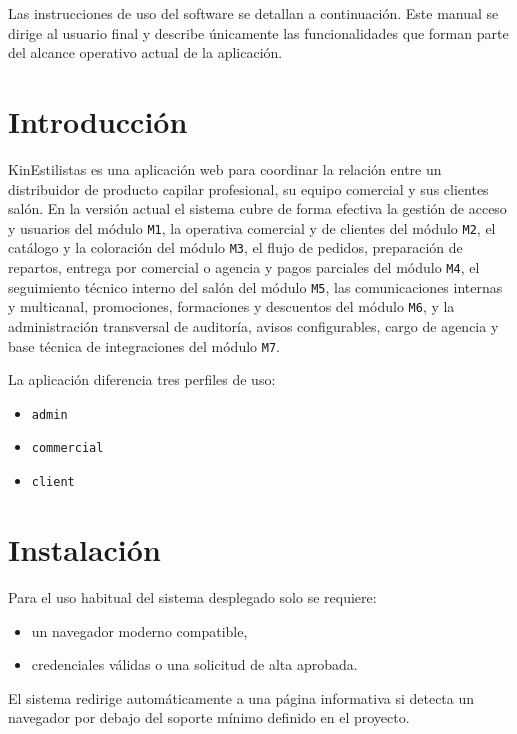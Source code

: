 Las instrucciones de uso del software se detallan a continuación. Este manual se dirige al usuario final y describe únicamente las funcionalidades que forman parte del alcance operativo actual de la aplicación.

\section{Introducción}

KinEstilistas es una aplicación web para coordinar la relación entre un distribuidor de producto capilar profesional, su equipo comercial y sus clientes salón. En la versión actual el sistema cubre de forma efectiva la gestión de acceso y usuarios del módulo \texttt{M1}, la operativa comercial y de clientes del módulo \texttt{M2}, el catálogo y la coloración del módulo \texttt{M3}, el flujo de pedidos, preparación de repartos, entrega por comercial o agencia y pagos parciales del módulo \texttt{M4}, el seguimiento técnico interno del salón del módulo \texttt{M5}, las comunicaciones internas y multicanal, promociones, formaciones y descuentos del módulo \texttt{M6}, y la administración transversal de auditoría, avisos configurables, cargo de agencia y base técnica de integraciones del módulo \texttt{M7}.

La aplicación diferencia tres perfiles de uso:

\begin{itemize}
    \item \texttt{admin}
    \item \texttt{commercial}
    \item \texttt{client}
\end{itemize}

\section{Instalación}

Para el uso habitual del sistema desplegado solo se requiere:

\begin{itemize}
    \item un navegador moderno compatible,
    \item credenciales válidas o una solicitud de alta aprobada.
\end{itemize}

El sistema redirige automáticamente a una página informativa si detecta un navegador por debajo del soporte mínimo definido en el proyecto.

